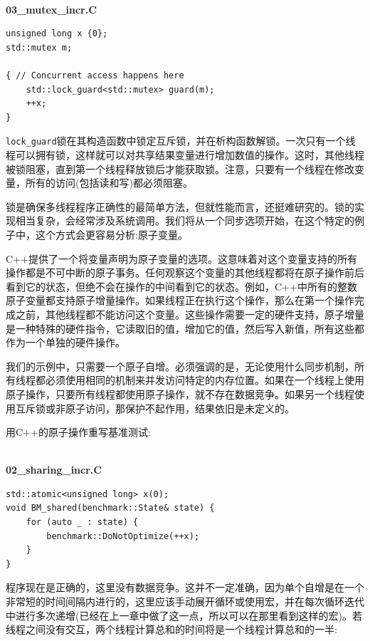 \hspace*{\fill} \\ %
\noindent
\textbf{03\_mutex\_incr.C}
\begin{lstlisting}[style=styleCXX]
unsigned long x {0};
std::mutex m;

{ // Concurrent access happens here
	std::lock_guard<std::mutex> guard(m);
	++x;
}
\end{lstlisting}

\texttt{lock\_guard}锁在其构造函数中锁定互斥锁，并在析构函数解锁。一次只有一个线程可以拥有锁，这样就可以对共享结果变量进行增加数值的操作。这时，其他线程被锁阻塞，直到第一个线程释放锁后才能获取锁。注意，只要有一个线程在修改变量，所有的访问(包括读和写)都必须阻塞。

锁是确保多线程程序正确性的最简单方法，但就性能而言，还挺难研究的。锁的实现相当复杂，会经常涉及系统调用。我们将从一个同步选项开始，在这个特定的例子中，这个方式会更容易分析:原子变量。

C++提供了一个将变量声明为原子变量的选项。这意味着对这个变量支持的所有操作都是不可中断的原子事务。任何观察这个变量的其他线程都将在原子操作前后看到它的状态，但绝不会在操作的中间看到它的状态。例如，C++中所有的整数原子变量都支持原子增量操作。如果线程正在执行这个操作，那么在第一个操作完成之前，其他线程都不能访问这个变量。这些操作需要一定的硬件支持，原子增量是一种特殊的硬件指令，它读取旧的值，增加它的值，然后写入新值，所有这些都作为一个单独的硬件操作。

我们的示例中，只需要一个原子自增。必须强调的是，无论使用什么同步机制，所有线程都必须使用相同的机制来并发访问特定的内存位置。如果在一个线程上使用原子操作，只要所有线程都使用原子操作，就不存在数据竞争。如果另一个线程使用互斥锁或非原子访问，那保护不起作用，结果依旧是未定义的。

用C++的原子操作重写基准测试:

\hspace*{\fill} \\ %
\noindent
\textbf{02\_sharing\_incr.C}
\begin{lstlisting}[style=styleCXX]
std::atomic<unsigned long> x(0);
void BM_shared(benchmark::State& state) {
	for (auto _ : state) {
		benchmark::DoNotOptimize(++x);
	}
}
\end{lstlisting}

程序现在是正确的，这里没有数据竞争。这并不一定准确，因为单个自增是在一个非常短的时间间隔内进行的，这里应该手动展开循环或使用宏，并在每次循环迭代中进行多次递增(已经在上一章中做了这一点，所以可以在那里看到这样的宏)。若线程之间没有交互，两个线程计算总和的时间将是一个线程计算总和的一半:

